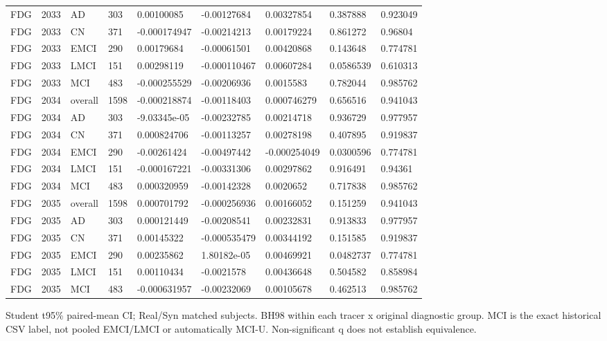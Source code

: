 \begin{landscape}
\begin{longtable}{lllllllll}
FDG & 2033 & AD & 303 & 0.00100085 & -0.00127684 & 0.00327854 & 0.387888 & 0.923049 \\
FDG & 2033 & CN & 371 & -0.000174947 & -0.00214213 & 0.00179224 & 0.861272 & 0.96804 \\
FDG & 2033 & EMCI & 290 & 0.00179684 & -0.00061501 & 0.00420868 & 0.143648 & 0.774781 \\
FDG & 2033 & LMCI & 151 & 0.00298119 & -0.000110467 & 0.00607284 & 0.0586539 & 0.610313 \\
FDG & 2033 & MCI & 483 & -0.000255529 & -0.00206936 & 0.0015583 & 0.782044 & 0.985762 \\
FDG & 2034 & overall & 1598 & -0.000218874 & -0.00118403 & 0.000746279 & 0.656516 & 0.941043 \\
FDG & 2034 & AD & 303 & -9.03345e-05 & -0.00232785 & 0.00214718 & 0.936729 & 0.977957 \\
FDG & 2034 & CN & 371 & 0.000824706 & -0.00113257 & 0.00278198 & 0.407895 & 0.919837 \\
FDG & 2034 & EMCI & 290 & -0.00261424 & -0.00497442 & -0.000254049 & 0.0300596 & 0.774781 \\
FDG & 2034 & LMCI & 151 & -0.000167221 & -0.00331306 & 0.00297862 & 0.916491 & 0.94361 \\
FDG & 2034 & MCI & 483 & 0.000320959 & -0.00142328 & 0.0020652 & 0.717838 & 0.985762 \\
FDG & 2035 & overall & 1598 & 0.000701792 & -0.000256936 & 0.00166052 & 0.151259 & 0.941043 \\
FDG & 2035 & AD & 303 & 0.000121449 & -0.00208541 & 0.00232831 & 0.913833 & 0.977957 \\
FDG & 2035 & CN & 371 & 0.00145322 & -0.000535479 & 0.00344192 & 0.151585 & 0.919837 \\
FDG & 2035 & EMCI & 290 & 0.00235862 & 1.80182e-05 & 0.00469921 & 0.0482737 & 0.774781 \\
FDG & 2035 & LMCI & 151 & 0.00110434 & -0.0021578 & 0.00436648 & 0.504582 & 0.858984 \\
FDG & 2035 & MCI & 483 & -0.000631957 & -0.00232069 & 0.00105678 & 0.462513 & 0.985762 \\
\end{longtable}
\noindent\parbox{\linewidth}{\footnotesize Student t95\% paired-mean CI; Real/Syn matched subjects. BH98 within each tracer x original diagnostic group. MCI is the exact historical CSV label, not pooled EMCI/LMCI or automatically MCI-U. Non-significant q does not establish equivalence.}
\endgroup
\end{landscape}
